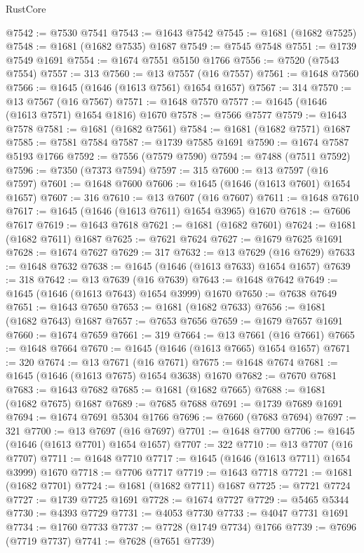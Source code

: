 \begin{lexlean}{RustCore}
\begin{coremodule}
@7542 := @7530 @7541
@7543 := @1643 @7542
@7545 := @1681 (@1682 @7525)
@7548 := @1681 (@1682 @7535) @1687
@7549 := @7545 @7548
@7551 := @1739 @7549 @1691
@7554 := @1674 @7551 @5150 @1766
@7556 := @7520 (@7543 @7554)
@7557 := 313
@7560 := @13 @7557 (@16 @7557)
@7561 := @1648 @7560
@7566 := @1645 (@1646 (@1613 @7561) @1654 @1657)
@7567 := 314
@7570 := @13 @7567 (@16 @7567)
@7571 := @1648 @7570
@7577 := @1645 (@1646 (@1613 @7571) @1654 @1816) @1670
@7578 := @7566 @7577
@7579 := @1643 @7578
@7581 := @1681 (@1682 @7561)
@7584 := @1681 (@1682 @7571) @1687
@7585 := @7581 @7584
@7587 := @1739 @7585 @1691
@7590 := @1674 @7587 @5193 @1766
@7592 := @7556 (@7579 @7590)
@7594 := @7488 (@7511 @7592)
@7596 := @7350 (@7373 @7594)
@7597 := 315
@7600 := @13 @7597 (@16 @7597)
@7601 := @1648 @7600
@7606 := @1645 (@1646 (@1613 @7601) @1654 @1657)
@7607 := 316
@7610 := @13 @7607 (@16 @7607)
@7611 := @1648 @7610
@7617 := @1645 (@1646 (@1613 @7611) @1654 @3965) @1670
@7618 := @7606 @7617
@7619 := @1643 @7618
@7621 := @1681 (@1682 @7601)
@7624 := @1681 (@1682 @7611) @1687
@7625 := @7621 @7624
@7627 := @1679 @7625 @1691
@7628 := @1674 @7627
@7629 := 317
@7632 := @13 @7629 (@16 @7629)
@7633 := @1648 @7632
@7638 := @1645 (@1646 (@1613 @7633) @1654 @1657)
@7639 := 318
@7642 := @13 @7639 (@16 @7639)
@7643 := @1648 @7642
@7649 := @1645 (@1646 (@1613 @7643) @1654 @3999) @1670
@7650 := @7638 @7649
@7651 := @1643 @7650
@7653 := @1681 (@1682 @7633)
@7656 := @1681 (@1682 @7643) @1687
@7657 := @7653 @7656
@7659 := @1679 @7657 @1691
@7660 := @1674 @7659
@7661 := 319
@7664 := @13 @7661 (@16 @7661)
@7665 := @1648 @7664
@7670 := @1645 (@1646 (@1613 @7665) @1654 @1657)
@7671 := 320
@7674 := @13 @7671 (@16 @7671)
@7675 := @1648 @7674
@7681 := @1645 (@1646 (@1613 @7675) @1654 @3638) @1670
@7682 := @7670 @7681
@7683 := @1643 @7682
@7685 := @1681 (@1682 @7665)
@7688 := @1681 (@1682 @7675) @1687
@7689 := @7685 @7688
@7691 := @1739 @7689 @1691
@7694 := @1674 @7691 @5304 @1766
@7696 := @7660 (@7683 @7694)
@7697 := 321
@7700 := @13 @7697 (@16 @7697)
@7701 := @1648 @7700
@7706 := @1645 (@1646 (@1613 @7701) @1654 @1657)
@7707 := 322
@7710 := @13 @7707 (@16 @7707)
@7711 := @1648 @7710
@7717 := @1645 (@1646 (@1613 @7711) @1654 @3999) @1670
@7718 := @7706 @7717
@7719 := @1643 @7718
@7721 := @1681 (@1682 @7701)
@7724 := @1681 (@1682 @7711) @1687
@7725 := @7721 @7724
@7727 := @1739 @7725 @1691
@7728 := @1674 @7727
@7729 := @5465 @5344
@7730 := @4393 @7729
@7731 := @4053 @7730
@7733 := @4047 @7731 @1691
@7734 := @1760 @7733
@7737 := @7728 (@1749 @7734) @1766
@7739 := @7696 (@7719 @7737)
@7741 := @7628 (@7651 @7739)

\end{coremodule}
\end{lexlean}
